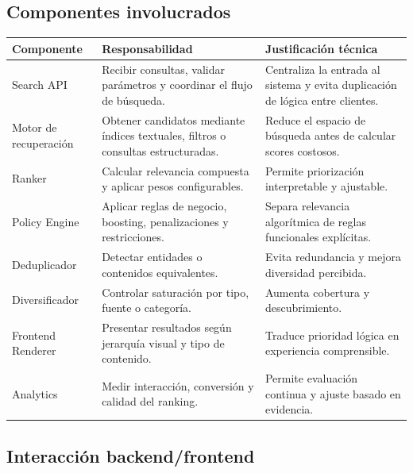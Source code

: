 \documentclass[12pt,a4paper]{article}
\begin{document}
\subsection{Componentes involucrados}

\begin{longtable}{p{4cm}p{5cm}p{5cm}}
\toprule
\textbf{Componente} & \textbf{Responsabilidad} & \textbf{Justificación técnica} \\
\midrule
\endhead

Search API & Recibir consultas, validar parámetros y coordinar el flujo de búsqueda. & Centraliza la entrada al sistema y evita duplicación de lógica entre clientes. \\

Motor de recuperación & Obtener candidatos mediante índices textuales, filtros o consultas estructuradas. & Reduce el espacio de búsqueda antes de calcular scores costosos. \\

Ranker & Calcular relevancia compuesta y aplicar pesos configurables. & Permite priorización interpretable y ajustable. \\

Policy Engine & Aplicar reglas de negocio, boosting, penalizaciones y restricciones. & Separa relevancia algorítmica de reglas funcionales explícitas. \\

Deduplicador & Detectar entidades o contenidos equivalentes. & Evita redundancia y mejora diversidad percibida. \\

Diversificador & Controlar saturación por tipo, fuente o categoría. & Aumenta cobertura y descubrimiento. \\

Frontend Renderer & Presentar resultados según jerarquía visual y tipo de contenido. & Traduce prioridad lógica en experiencia comprensible. \\

Analytics & Medir interacción, conversión y calidad del ranking. & Permite evaluación continua y ajuste basado en evidencia. \\

\bottomrule
\end{longtable}

\subsection{Interacción backend/frontend}
\end{document}
